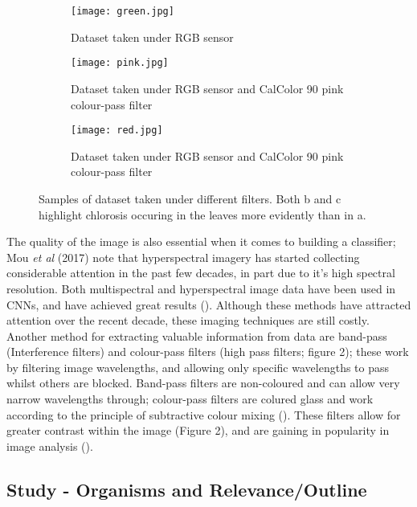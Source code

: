 \documentclass[../../Paper.tex]{subfiles}
\begin{document}
\begin{figure}[!t]
    \centering
    \begin{subfigure}[b]{0.3\textwidth}
        \texttt{[image: green.jpg]}
        \caption{Dataset taken under RGB sensor \\ 
        }
  		\label{fig:sub1}
    \end{subfigure}
    \begin{subfigure}[b]{0.3\textwidth}
        \texttt{[image: pink.jpg]}
        \caption{Dataset taken under RGB sensor and CalColor 90 pink colour-pass filter}
  		\label{fig:sub2}
    \end{subfigure}
    \begin{subfigure}[b]{0.3\textwidth}
        \texttt{[image: red.jpg]}
        \caption{Dataset taken under RGB sensor and CalColor 90 pink colour-pass filter}
  		\label{fig:sub2}
    \end{subfigure}
    \caption{Samples of dataset taken under different filters. Both b and c highlight chlorosis occuring in the leaves more evidently than in a.}
\label{fig:test}
\end{figure}

The quality of the image is also essential when it comes to building a classifier; Mou \textit{et al} (2017) note that hyperspectral imagery has started collecting considerable attention in the past few decades, in part due to it's high spectral resolution. Both multispectral and hyperspectral image data have been used in CNNs, and have achieved great results (\cite{harsanyi_hyperspectral_1994,delalieux_detection_2007,baranowski_hyperspectral_2015, zhu_early_2016, lowe_hyperspectral_2017,mou_deep_2017}). Although these methods have attracted attention over the recent decade, these imaging techniques are still costly. Another method for extracting valuable information from data are band-pass (Interference filters) and colour-pass filters (high pass filters; figure 2); these work by filtering image wavelengths, and allowing only specific wavelengths to pass whilst others are blocked. Band-pass filters are non-coloured and can allow very narrow wavelengths through; colour-pass filters are colured glass and work according to the principle of subtractive colour mixing (\cite{sischka_using_2018}). These filters allow for greater contrast within the image (Figure 2), and are gaining in popularity in image analysis (\cite{piron_selection_2008, knoth_unmanned_2013}).

\subsection*{Study - Organisms and Relevance/Outline }
\end{document}
